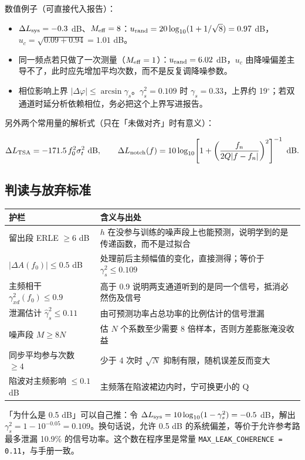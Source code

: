 \documentclass[UTF8,a4paper,12pt,scheme=chinese]{ctexart}
\begin{document}
数值例子（可直接代入报告）：

\begin{itemize}[leftmargin=2em]
  \item $\Delta L_{\rm sys}=-0.3$ dB、$M_{\rm eff}=8$：$u_{\rm rand}=20\log_{10}(1+1/\sqrt{8})=0.97$ dB，$u_c=\sqrt{0.09+0.94}=1.01$ dB。
  \item 同一频点若只做了一次测量（$M_{\rm eff}=1$）：$u_{\rm rand}=6.02$ dB，$u_c$ 由降噪偏差主导不了，此时应先增加平均次数，而不是反复调降噪参数。
  \item 相位影响上界 $|\Delta\varphi|\le\arcsin\gamma_s$。$\gamma_s^2=0.109$ 时 $\gamma_s=0.33$，上界约 19$^\circ$；若双通道时延分析依赖相位，务必把这个上界写进报告。
\end{itemize}

另外两个常用量的解析式（只在「未做对齐」时有意义）：

\[
\Delta L_{\rm TSA}=-171.5\,f_0^{2}\sigma_t^{2}\ {\rm dB},
\qquad
\Delta L_{\rm notch}(f)=10\log_{10}\!\left[1+\left(\frac{f_n}{2Q|f-f_n|}\right)^{2}\right]^{-1}\ {\rm dB}.
\]

\subsection{判读与放弃标准}

\noindent\begin{longtable}{@{}p{}p{}@{}}
\toprule
护栏 & 含义与出处 \\
\midrule
\endhead
留出段 ERLE $\ge 6$ dB & $h$ 在没参与训练的噪声段上也能预测，说明学到的是传递函数，而不是过拟合 \\
$|\Delta A(f_0)|\le 0.5$ dB & 处理前后主频幅值的变化，直接测得；等价于 $\gamma_s^2\le 0.109$ \\
主频相干 $\gamma^2_{xd}(f_0)\le 0.9$ & 高于 0.9 说明两支通道听到的是同一个信号，抵消必然伤及信号 \\
泄漏估计 $\hat\gamma_s^2\le 0.11$ & 由可预测功率占总功率的比例估计的信号泄漏 \\
噪声段 $M\ge 8N$ & 估 $N$ 个系数至少需要 8 倍样本，否则方差膨胀淹没收益 \\
同步平均参与次数 $\ge 4$ & 少于 4 次时 $\sqrt{N}$ 抑制有限，随机误差反而变大 \\
陷波对主频影响 $\le 0.1$ dB & 主频落在陷波裙边内时，宁可换更小的 Q \\
\bottomrule
\end{longtable}

「为什么是 0.5 dB」可以自己推：令 $\Delta L_{\rm sys}=10\log_{10}(1-\gamma_s^{2})=-0.5$ dB，解出 $\gamma_s^{2}=1-10^{-0.05}=0.109$。换句话说，允许 0.5 dB 的系统偏差，等价于允许参考路最多泄漏 10.9\% 的信号功率。这个数在程序里是常量 \texttt{MAX\_LEAK\_COHERENCE = 0.11}，与手册一致。
\end{document}
